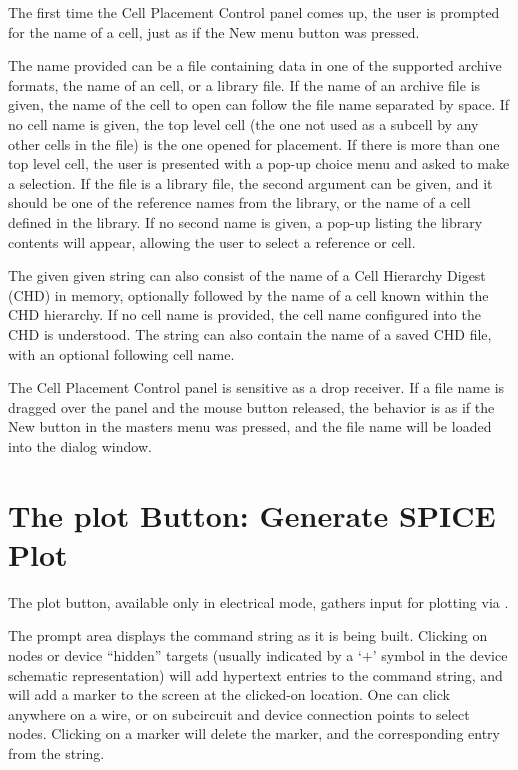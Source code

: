 The first time the {\cb Cell Placement Control} panel comes up, the
user is prompted for the name of a cell, just as if the {\cb New} menu
button was pressed.

The name provided can be a file containing data in one of the
supported archive formats, the name of an {\Xic} cell, or a library
file.  If the name of an archive file is given, the name of the cell
to open can follow the file name separated by space.  If no cell name
is given, the top level cell (the one not used as a subcell by any
other cells in the file) is the one opened for placement.  If there is
more than one top level cell, the user is presented with a pop-up
choice menu and asked to make a selection.  If the file is a library
file, the second argument can be given, and it should be one of the
reference names from the library, or the name of a cell defined in the
library.  If no second name is given, a pop-up listing the library
contents will appear, allowing the user to select a reference or cell.

The given given string can also consist of the name of a Cell
Hierarchy Digest (CHD) in memory, optionally followed by the name of a
cell known within the CHD hierarchy.  If no cell name is provided, the
cell name configured into the CHD is understood.  The string can also
contain the name of a saved CHD file, with an optional following cell
name.

The {\cb Cell Placement Control} panel is sensitive as a drop
receiver.  If a file name is dragged over the panel and the mouse
button released, the behavior is as if the {\cb New} button in the
masters menu was pressed, and the file name will be loaded into the
dialog window.


\section{The {\cb plot} Button: Generate SPICE Plot}

The {\cb plot} button, available only in electrical mode, gathers
input for plotting via {\WRspice}.

The prompt area displays the command string as it is being built. 
Clicking on nodes or device ``hidden'' targets (usually indicated by a
`$+$' symbol in the device schematic representation) will add
hypertext entries to the command string, and will add a marker to the
screen at the clicked-on location.  One can click anywhere on a wire,
or on subcircuit and device connection points to select nodes. 
Clicking on a marker will delete the marker, and the corresponding
entry from the string.

